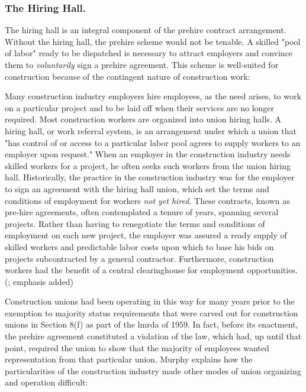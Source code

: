 \documentclass[12pt]{article}
\renewenvironment{quote}
  {\list{}{\leftmargin=\parindent\rightmargin=0pt}%
   \item\relax}
  {\endlist}
\begin{document}
\subsubsection{The Hiring Hall.}

The hiring hall is an integral component of the prehire contract arrangement. Without the hiring hall, the prehire scheme would not be tenable. A skilled "pool of labor" ready to be dispatched is necessary to attract employers and convince them to \emph{voluntarily} sign a prehire agreement. This scheme is well-suited for construction because of the contingent nature of construction work:

\begin{quote}
Many construction industry employers hire employees, as the need arises, to work on a particular project and to be laid off when their services are no longer required. Most construction workers are organized into union hiring halls. A hiring hall, or work referral system, is an arrangement under which a union that "has control of or access to a particular labor pool agrees to supply workers to an employer upon request." When an employer in the construction industry needs skilled workers for a project, he often seeks such workers from the union hiring hall. Historically, the practice in the construction industry was for the employer to sign an agreement with the hiring hall union, which set the terms and conditions of employment for workers \textit{not yet hired}. These contracts, known as pre-hire agreements, often contemplated a tenure of years, spanning several projects. Rather than having to renegotiate the terms and conditions of employment on each new project, the employer was assured a ready supply of skilled workers and predictable labor costs upon which to base his bids on projects subcontracted by a general contractor. Furthermore, construction workers had the benefit of a central clearinghouse for employment opportunities. (\cite[1014–15]{murphyPreHireAgreementsSection1982}; emphasis added)
\end{quote}

Construction unions had been operating in this way for many years prior to the exemption to majority status requirements that were carved out for construction unions in Section 8(f) as part of the \acrshort{lmrda} of 1959. In fact, before its enactment, the prehire agreement constituted a violation of the law, which had, up until that point, required the union to show that the majority of employees wanted representation from that particular union. Murphy explains how the particularities of the construction industry made other modes of union organizing and operation difficult:
\end{document}
